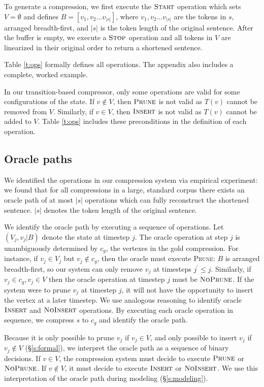 \documentclass[11pt,a4paper]{article}
\begin{document}
To generate a compression, we first execute the $\textsc{Start}$ operation which sets $V=\emptyset$ and defines $B=[v_1, v_2 ... v_{|s|}]$, where $v_1, v_2 ... v_{|s|}$ are the tokens in $s$, arranged breadth-first, and $|s|$ is the token length of the original sentence. After the buffer is empty, we execute a $\textsc{Stop}$ operation and all tokens in $V$ are linearized in their original order to return a shortened sentence. 

Table \ref{t:ops} formally defines all operations. The appendix also includes a complete, worked example. 

In our transition-based compressor, only some operations are valid for some configurations of the state. If $v \notin V$, then $\textsc{Prune}$ is not valid as $T(v)$ cannot be removed from $V$. Similarly, if $v \in V$, then $\textsc{Insert}$ is not valid as $T(v)$ cannot be added to $V$. Table \ref{t:ops} includes these preconditions in the definition of each operation.

\subsection{Oracle paths}\label{s:oracle}

We identified the operations in our compression system via empirical experiment: we found that for all compressions in a large, standard corpus \cite{filippova2013overcoming} there exists an oracle path of at most $|s|$ operations which can fully reconstruct the shortened sentence. $|s|$ denotes the token length of the original sentence.

We identify the oracle path by executing  a sequence of operations. Let $(V_j, v_j | B)$ denote the state at timestep $j$. The oracle operation at step $j$ is unambiguously determined by $c_g$, the vertexes in the gold compression. For instance, if $v_j \in V_j$ but $v_j \notin c_g$, then the oracle must execute \textsc{Prune}: $B$ is arranged breadth-first, so our system can only remove $v_j$ at timesteps $j^{\prime} \leq j$. Similarly, if $v_j \in c_g, v_j \in V$ then the oracle operation at timestep $j$ must be $\textsc{NoPrune}$. If the system were to prune $v_j$ at timestep $j$, it will not have the opportunity to insert the vertex at a later timestep. We use analogous reasoning to identify oracle $\textsc{Insert}$ and $\textsc{NoInsert}$ operations. By executing each oracle operation in sequence, we compress $s$ to $c_g$ and identify the oracle path.

Because it is only possible to prune $v_j$ if $v_j \in V$, and only possible to insert $v_j$ if $v_j \notin V$ (\S\ref{s:formal}), we interpret the oracle path as a sequence of binary decisions. If $v \in V$, the compression system must decide to execute $\textsc{Prune}$ or $\textsc{NoPrune}$. If $v \notin V$, it must decide to execute $\textsc{Insert}$ or $\textsc{NoInsert}$. We use this interpretation of the oracle path during modeling (\S\ref{s:modeling}).
\end{document}
